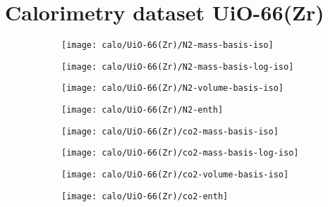 
\section{Calorimetry dataset UiO-66(Zr)}

\begin{figure}[H]
    \centering

    \begin{subfigure}{0.25\linewidth}
        \texttt{[image: calo/UiO-66(Zr)/N2-mass-basis-iso]}%
        \label{appx:fig:shaping:uio66n2mass}
    \end{subfigure}%
    \begin{subfigure}{0.25\linewidth}
        \texttt{[image: calo/UiO-66(Zr)/N2-mass-basis-log-iso]}%
        \label{appx:fig:shaping:uio66n2masslog}
    \end{subfigure}%
    \begin{subfigure}{0.25\linewidth}
        \texttt{[image: calo/UiO-66(Zr)/N2-volume-basis-iso]}%
        \label{appx:fig:shaping:uio66n2volume}
    \end{subfigure}%
    \begin{subfigure}{0.25\linewidth}
        \texttt{[image: calo/UiO-66(Zr)/N2-enth]}%
        \label{appx:fig:shaping:uio66n2enth}%
    \end{subfigure}%

    \begin{subfigure}{0.25\textwidth}
        \texttt{[image: calo/UiO-66(Zr)/co2-mass-basis-iso]}%
        \label{appx:fig:shaping:uio66co2mass}
    \end{subfigure}%
    \begin{subfigure}{0.25\textwidth}
        \texttt{[image: calo/UiO-66(Zr)/co2-mass-basis-log-iso]}%
        \label{appx:fig:shaping:uio66co2masslog}
    \end{subfigure}%
    \begin{subfigure}{0.25\textwidth}
        \texttt{[image: calo/UiO-66(Zr)/co2-volume-basis-iso]}%
        \label{appx:fig:shaping:uio66co2volume}
    \end{subfigure}%
    \begin{subfigure}{0.25\textwidth}
        \texttt{[image: calo/UiO-66(Zr)/co2-enth]}%
        \label{appx:fig:shaping:uio66co2enth}%
    \end{subfigure}%


\end{figure}
